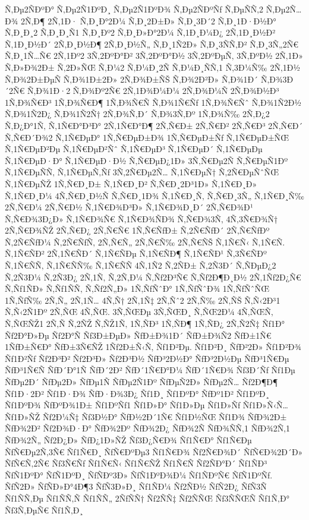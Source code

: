 {Ñ‚Ðµ2ÑÐºÐ°
Ñ‚Ðµ2Ñ1ÐºÐ¸
Ñ‚Ðµ2Ñ1ÐºÐ¾
Ñ‚Ðµ2ÑÐºÑƒ
Ñ‚ÐµÑÑ‚2
Ñ‚Ðµ2Ñ…Ð¾
2Ñ‚Ð¶
2Ñ‚1Ð·
Ñ‚Ð¸Ð°2Ð¼
Ñ‚Ð¸2Ð±Ð»
Ñ‚Ð¸3Ð´2
Ñ‚Ð¸1Ð·Ð½Ð°
Ñ‚Ð¸Ð¸2
Ñ‚Ð¸Ð¸Ñ1
Ñ‚Ð¸Ðº2
Ñ‚Ð¸Ð»Ð°2Ð¼
Ñ‚1Ð¸Ð¼Ð¿
2Ñ‚1Ð¸Ð½Ð²
Ñ‚1Ð¸Ð½Ð´
2Ñ‚Ð¸Ð½Ð¶
2Ñ‚Ð¸Ð½Ñ„
Ñ‚Ð¸1Ñ2Ð»
Ñ‚Ð¸3ÑÑ‚Ð²
Ñ‚Ð¸3Ñ„2Ñ€
Ñ‚Ð¸1Ñ…Ñ€
2Ñ‚1Ðº2
3Ñ‚2ÐºÐ°Ð²
3Ñ‚2ÐºÐ°Ð½
3Ñ‚2ÐºÐµÑ‚
3Ñ‚ÐºÐ½
2Ñ‚1Ð»
Ñ‚Ð»Ð¾2Ð±
Ñ‚2Ð»ÑŒ
Ñ‚Ð¼2
Ñ‚Ð¼Ð¸2Ñ
Ñ‚Ð¼Ð¸ÑÑ‚1
Ñ‚3Ð¼Ñ‰
2Ñ‚1Ð½
Ñ‚Ð¾2Ð±ÐµÑ
Ñ‚Ð¾1Ð±2Ð»
2Ñ‚Ð¾Ð±ÑŠ
Ñ‚Ð¾2Ð²Ð»
Ñ‚Ð¾1Ð´
Ñ‚Ð¾3Ð´2Ñ€
Ñ‚Ð¾1Ð·2
Ñ‚Ð¾Ðº2Ñ€
2Ñ‚1Ð¾Ð¼Ð¼
2Ñ‚Ð¾Ð¼Ñ
2Ñ‚Ð¾Ð½Ð³
1Ñ‚Ð¾Ñ€Ð³
1Ñ‚Ð¾Ñ€Ð¶
1Ñ‚Ð¾Ñ€Ñ
Ñ‚Ð¾1Ñ€Ñƒ
1Ñ‚Ð¾Ñ€Ñˆ
Ñ‚Ð¾1Ñ2Ð½
Ñ‚Ð¾1Ñ2Ð¿
Ñ‚Ð¾1Ñ2Ñ†
2Ñ‚Ð¾Ñ‚Ð´
Ñ‚Ð¾3Ñ‚Ðº
1Ñ‚Ð¾Ñ‰
2Ñ‚Ð¿2
Ñ‚Ð¿Ð°1Ñ‚
Ñ‚1Ñ€Ð°Ð³Ð°
2Ñ‚1Ñ€Ð°Ð¶
2Ñ‚Ñ€Ð±
2Ñ‚Ñ€Ð²
2Ñ‚Ñ€Ð³
2Ñ‚Ñ€Ð´
Ñ‚Ñ€Ð´Ð¾2
Ñ‚1Ñ€ÐµÐ°
1Ñ‚Ñ€ÐµÐ±Ð¾
1Ñ‚Ñ€ÐµÐ±Ñƒ
Ñ‚1Ñ€ÐµÐ±ÑŒ
Ñ‚1Ñ€ÐµÐ²Ðµ
Ñ‚1Ñ€ÐµÐ²Ñˆ
Ñ‚1Ñ€ÐµÐ³
Ñ‚1Ñ€ÐµÐ´
Ñ‚1Ñ€ÐµÐµ
Ñ‚1Ñ€ÐµÐ·Ð°
Ñ‚1Ñ€ÐµÐ·Ð½
Ñ‚Ñ€ÐµÐ¿1Ð»
3Ñ‚Ñ€Ðµ2Ñ
Ñ‚Ñ€ÐµÑ1Ðº
Ñ‚1Ñ€ÐµÑÑ‚
Ñ‚1Ñ€ÐµÑ‚Ñƒ
3Ñ‚2Ñ€Ðµ2Ñ…
Ñ‚1Ñ€ÐµÑ†
Ñ‚2Ñ€ÐµÑˆÑŒ
Ñ‚1Ñ€ÐµÑŽ
1Ñ‚Ñ€Ð¸Ð±
Ñ‚1Ñ€Ð¸Ð²
Ñ‚Ñ€Ð¸2Ð³1Ð»
Ñ‚1Ñ€Ð¸Ð»
Ñ‚1Ñ€Ð¸Ð¼
4Ñ‚Ñ€Ð¸Ð½Ñ
Ñ‚Ñ€Ð¸1Ð¾
Ñ‚1Ñ€Ð¸Ñ‚
Ñ‚Ñ€Ð¸3Ñ„
Ñ‚1Ñ€Ð¸Ñ‰
2Ñ‚Ñ€Ð¼
2Ñ‚Ñ€Ð½
Ñ‚1Ñ€Ð¾Ð³Ð»
Ñ‚1Ñ€Ð¾Ð¸Ð´
2Ñ‚Ñ€Ð¾Ð¹
Ñ‚Ñ€Ð¾3Ð¿Ð»
Ñ‚1Ñ€Ð¾Ñ€
Ñ‚1Ñ€Ð¾ÑÐ¾
Ñ‚Ñ€Ð¾3Ñ‚
4Ñ‚3Ñ€Ð¾Ñ†
2Ñ‚Ñ€Ð¾ÑŽ
2Ñ‚Ñ€Ð¿
2Ñ‚Ñ€Ñ€
1Ñ‚Ñ€ÑƒÐ±
Ñ‚2Ñ€ÑƒÐ´
2Ñ‚Ñ€ÑƒÐº
Ñ‚2Ñ€ÑƒÐ¼
Ñ‚2Ñ€ÑƒÑ‚
2Ñ‚Ñ€Ñ„
2Ñ‚Ñ€Ñ‰
2Ñ‚Ñ€ÑŠ
Ñ‚1Ñ€Ñ‹
Ñ‚1Ñ€Ñ.
Ñ‚1Ñ€ÑÐ²
2Ñ‚1Ñ€ÑÐ´
Ñ‚1Ñ€ÑÐµ
Ñ‚1Ñ€ÑÐ¶
Ñ‚1Ñ€ÑÐ¹
Ñ‚3Ñ€ÑÐº
Ñ‚1Ñ€ÑÑ‚
Ñ‚1Ñ€ÑÑ‰
Ñ‚1Ñ€ÑÑ
4Ñ‚1Ñ2
Ñ‚2ÑÐ±
Ñ‚2Ñ3Ð´
Ñ‚ÑÐµÐ¿2
Ñ‚2Ñ3Ð¼
Ñ‚2Ñ3Ð¿
2Ñ‚1Ñ‚
Ñ‚2Ñ‚Ð¼
Ñ‚Ñƒ2Ð³Ñ€
Ñ‚Ñƒ2Ð¶Ð¸Ð½
2Ñ‚1Ñƒ2Ð¿Ñ€
Ñ‚Ñƒ1ÑÐ»
Ñ‚Ñƒ1ÑÑ‚
Ñ‚Ñƒ2Ñ„Ð»
1Ñ‚ÑƒÑˆÐ°
1Ñ‚ÑƒÑˆÐ¾
1Ñ‚ÑƒÑˆÑŒ
1Ñ‚ÑƒÑ‰
2Ñ‚Ñ„
2Ñ‚1Ñ…
4Ñ‚Ñ†
2Ñ‚1Ñ‡
2Ñ‚Ñˆ2
2Ñ‚Ñ‰
2Ñ‚ÑŠ
Ñ‚Ñ‹2Ð³1
Ñ‚Ñ‹2Ñ1Ðº
2Ñ‚ÑŒ
4Ñ‚ÑŒ.
3Ñ‚ÑŒÐµ
3Ñ‚ÑŒÐ¸
Ñ‚ÑŒ2Ð¼
4Ñ‚ÑŒÑ‚
Ñ‚ÑŒÑŽ1
2Ñ‚Ñ
Ñ‚2ÑŽ
Ñ‚ÑŽ1Ñ‚
1Ñ‚ÑÐ³
1Ñ‚ÑÐ¶
1Ñ‚ÑÐ¿
2Ñ‚Ñ2Ñ‡
Ñƒ1Ð°
Ñƒ2Ð°Ð»Ðµ
Ñƒ2Ð°Ñ
Ñƒ3Ð±ÐµÐ»
ÑƒÐ±Ð¾1Ð´
ÑƒÐ±Ð¾Ñ2
ÑƒÐ±1Ñ€
1ÑƒÐ±Ñ€Ð°
ÑƒÐ±3Ñ€ÑŽ
1Ñƒ2Ð±Ñ‹Ñ‚
Ñƒ1Ð²Ðµ.
Ñƒ1Ð²Ð¸
ÑƒÐ²2Ð»
Ñƒ1Ð²Ð¾
Ñƒ1Ð²Ñƒ
Ñƒ2Ð³Ð²
Ñƒ2Ð³Ð»
Ñƒ2Ð³Ð½
ÑƒÐ³2Ð½Ð°
ÑƒÐ³2Ð½Ðµ
ÑƒÐ³1Ñ€Ðµ
ÑƒÐ³1Ñ€Ñ
ÑƒÐ´Ð°1Ñ
ÑƒÐ´2Ð²
ÑƒÐ´1Ñ€Ð°Ð¼
ÑƒÐ´1Ñ€Ð¾
Ñƒ3Ð´Ñƒ
Ñƒ1Ðµ
ÑƒÐµ2Ð´
ÑƒÐµ2Ð»
ÑƒÐµ1Ñ
ÑƒÐµ2Ñ1Ðº
ÑƒÐµÑ2Ð»
ÑƒÐµ2Ñ…
Ñƒ2Ð¶Ð¶
Ñƒ1Ð·2Ð²
Ñƒ1Ð·Ð¾
ÑƒÐ·Ð¾3Ð¿
Ñƒ1Ð¸
Ñƒ1ÐºÐ°
ÑƒÐº1Ð²
Ñƒ1ÐºÐ¸
Ñƒ1ÐºÐ¾
ÑƒÐºÐ¾1Ð±
Ñƒ1ÐºÑƒ1
Ñƒ1Ð»Ð°
Ñƒ1Ð»Ðµ
Ñƒ1Ð»Ñƒ
Ñƒ1Ð»Ñ‹Ñ…
Ñƒ1Ð»ÑŽ
Ñƒ2Ð¼Ñ‡
Ñƒ3Ð½Ð°
ÑƒÐ½2Ð´1Ñ€
Ñƒ1Ð½ÑŒ
Ñƒ1Ð¾
ÑƒÐ¾2Ð±
ÑƒÐ¾2Ð²
Ñƒ2Ð¾Ð·Ð°
ÑƒÐ¾2Ðº
ÑƒÐ¾2Ð¿
ÑƒÐ¾2Ñ
ÑƒÐ¾ÑÑ‚1
ÑƒÐ¾2Ñ‚1
ÑƒÐ¾2Ñ„
Ñƒ2Ð¿Ð»
ÑƒÐ¿1Ð»ÑŽ
Ñƒ3Ð¿Ñ€Ð¾
Ñƒ1Ñ€Ð°
Ñƒ1Ñ€Ðµ
ÑƒÑ€Ðµ2Ñ‚3Ñ€
Ñƒ1Ñ€Ð¸
ÑƒÑ€ÐºÐµ3
Ñƒ1Ñ€Ð¾
Ñƒ2Ñ€Ð¾Ð´
ÑƒÑ€Ð¾2Ð´Ð»
ÑƒÑ€Ñ‚2Ñ€
Ñƒ3Ñ€Ñƒ
Ñƒ1Ñ€Ñ‹
Ñƒ1Ñ€ÑŽ
Ñƒ1Ñ€Ñ
Ñƒ2ÑÐ°Ð´
Ñƒ1ÑÐ³
ÑƒÑ1ÐºÐ°
ÑƒÑ1ÐºÐ¸
ÑƒÑÐº3Ð»
ÑƒÑ1ÐºÐ¾Ð¼
Ñƒ1ÑÐºÑ€
ÑƒÑ1ÐºÑƒ.
ÑƒÑ2Ð»
ÑƒÑÐ»Ð°4Ð¶3
ÑƒÑ3Ð»Ð¸
Ñƒ1ÑÐ¼
Ñƒ2ÑÐ½
ÑƒÑ2Ð¿
ÑƒÑ3Ñ
Ñƒ1ÑÑ‚Ðµ
Ñƒ1ÑÑ‚Ñ
Ñƒ1ÑÑ„
2ÑƒÑÑ†
Ñƒ2ÑÑ‡
Ñƒ2ÑÑŒ
Ñƒ3ÑÑŒÑ
Ñƒ1Ñ‚Ð°
Ñƒ3Ñ‚ÐµÑ€
Ñƒ1Ñ‚Ð¸
}
